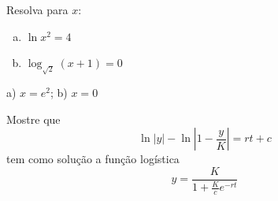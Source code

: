 \begin{exer}
  Resolva para $x$:
  \begin{enumerate}[a)]
  \item $\ln x^2 = 4$
  \item $\log_{\sqrt{2}} (x+1) = 0$
  \end{enumerate}
\end{exer}
\begin{resp}
  a) $x=e^2$; b) $x=0$
\end{resp}

\begin{exer}
  Mostre que
  \begin{equation}
    \ln|y| - \ln\left|1 - \frac{y}{K}\right| = rt + c
  \end{equation}
  tem como solução a função logística
  \begin{equation}
    y = \frac{K}{1 + \frac{K}{c}e^{-rt}}
  \end{equation}
\end{exer}